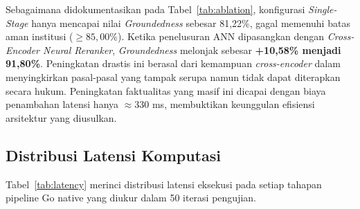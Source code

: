 \documentclass[conference]{IEEEtran}
\begin{document}
\begin{table}[htbp]
\caption{Studi Ablasi: Single-Stage Baseline vs. Proposed Two-Stage RAG}
\label{tab:ablation}
\centering
{}
\end{table}

Sebagaimana didokumentasikan pada Tabel~\ref{tab:ablation}, konfigurasi \textit{Single-Stage} hanya mencapai nilai \textit{Groundedness} sebesar 81,22\%, gagal memenuhi batas aman institusi ($\ge 85,00\%$). Ketika penelusuran ANN dipasangkan dengan \textit{Cross-Encoder Neural Reranker}, \textit{Groundedness} melonjak sebesar \textbf{+10,58\% menjadi 91,80\%}. Peningkatan drastis ini berasal dari kemampuan \textit{cross-encoder} dalam menyingkirkan pasal-pasal yang tampak serupa namun tidak dapat diterapkan secara hukum. Peningkatan faktualitas yang masif ini dicapai dengan biaya penambahan latensi hanya $\approx$330 ms, membuktikan keunggulan efisiensi arsitektur yang diusulkan.

\subsection{Distribusi Latensi Komputasi}
Tabel~\ref{tab:latency} merinci distribusi latensi eksekusi pada setiap tahapan pipeline Go native yang diukur dalam 50 iterasi pengujian.
\end{document}
